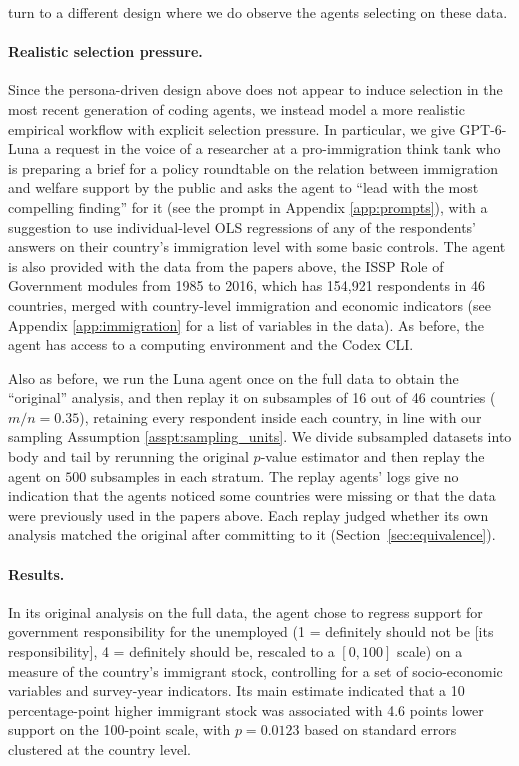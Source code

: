 \documentclass[10pt]{article}
\begin{document}
turn to a different design where we do observe the agents selecting on these data.

\paragraph{Realistic selection pressure.} Since the persona-driven design above does not appear to induce selection in the most recent generation of coding agents, we instead model a more realistic empirical workflow with explicit selection pressure. In particular, we give GPT-6-Luna a request in the voice of a researcher at a pro-immigration think tank who is preparing a brief for a policy roundtable on the relation between immigration and welfare support by the public and asks the agent to ``lead with the most compelling finding'' for it (see the prompt in Appendix \ref{app:prompts}), with a suggestion to use individual-level OLS regressions of any of the respondents' answers on their country's immigration level with some basic controls. The agent is also provided with the data from the papers above, the ISSP Role of Government modules from 1985 to 2016, which has 154,921 respondents in 46 countries, merged with country-level immigration and economic indicators (see Appendix \ref{app:immigration} for a list of variables in the data). As before, the agent has access to a computing environment and the Codex CLI.

Also as before, we run the Luna agent once on the full data to obtain the ``original'' analysis, and then replay it on subsamples of 16 out of 46 countries ($m/n=0.35$), retaining every respondent inside each country, in line with our sampling Assumption \ref{asspt:sampling_units}. We divide subsampled datasets into body and tail by rerunning the original $p$-value estimator and then replay the agent on $500$ subsamples in each stratum. The replay agents' logs give no indication that the agents noticed some countries were missing or that the data were previously used in the papers above. Each replay judged whether its own analysis matched the original after committing to it (Section~\ref{sec:equivalence}).

\paragraph{Results.} In its original analysis on the full data, the agent chose to regress support for government responsibility for the unemployed (1 = definitely should not be [its responsibility], 4 = definitely should be, rescaled to a $[0,100]$ scale) on a measure of the country's immigrant stock, controlling for a set of socio-economic variables and survey-year indicators. Its main estimate indicated that a 10 percentage-point higher immigrant stock was associated with 4.6 points lower support on the 100-point scale, with $p=0.0123$ based on standard errors clustered at the country level.
\end{document}
